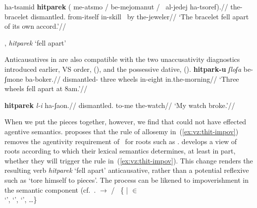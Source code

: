 {{\pex
	\a \begingl
	\gla ha-{ts}amid \textbf{hitparek} ({\cmark} me-a{ts}mo / {\xmark} be-mejomanut / {\xmark}~al-jedej ha-{ts}oref).//
	\glb the-bracelet dismantled. {} from-itself {} {} in-skill {} {\phantom{\xmark}}~by the-jeweler//
	\glft `The bracelet fell apart of its own accord.'//
	\endgl

	\a {\thit}, \emph{hitparek} `fell apart'\\
\xe

Anticausatives in {\thit} are also compatible with the two unaccusativity diagnostics introduced earlier,  VS order, (\nextx), and the possessive dative, (\anextx).
\ex\label{ex:vs-anticaus} \begingl
	\gla{}\textbf{hitpark-u} \emph{ʃloʃa}  be-ʃmone ba-boker.//
	\glb dismantled- three wheels in-eight in.the-morning//
	\glft `Three wheels fell apart at 8am.'//
	\endgl
\xe

\ex
\begingl
\gla{}\textbf{hitparek} \emph{l-i} ha-ʃaon.//
\glb dismantled. to-me the-watch//
\glft `My watch broke.'//
\endgl
\xe

When we put the pieces together, however, we find that {\va} could not have effected agentive semantics. \cite{kastner17gjgl} proposes that the rule of allosemy in~(\ref{ex:vz:thit-impov}) removes the agentivity requirement of {\va}~for roots such as . \cite{kastner16phd,kastner17gjgl} develops a view of roots according to which their lexical semantics determines, at least in part, whether they will trigger the rule in~(\ref{ex:vz:thit-impov}). This change renders the resulting verb \emph{hitparek} `fell apart' anticausative, rather than a potential reflexive such as `tore himself to pieces'. The process can be likened to impoverishment \citep{bonet91,noyer98} in the semantic component (cf.~\citealt{nevins15roots}.
\ex\label{ex:vz:thit-impov}\denote{\va~\!} $\rightarrow$ {\zero} / {\vz} \trace~\{ | 
  $\in$ 
 \\ \phantom{a} \hfill 
	 `',  `',  `', \dots\}
\xe

}}
